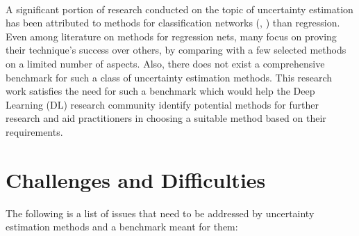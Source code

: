 	\\
	A significant portion of research conducted on the topic of uncertainty estimation has been attributed to methods for classification networks (\cite{sensoy2018evidential}, \cite{malinin2018predictive}) than regression. Even among literature on methods for regression nets, many focus on proving their technique's success over others, by comparing with a few selected methods on a limited number of aspects. Also, there does not exist a comprehensive benchmark for such a class of uncertainty estimation methods. This research work satisfies the need for such a benchmark which would help the Deep Learning (DL) research community identify potential methods for further research and aid practitioners in choosing a suitable method based on their requirements.     
    \section{Challenges and Difficulties}
    The following is a list of issues that need to be addressed by uncertainty estimation methods and a benchmark meant for them:
